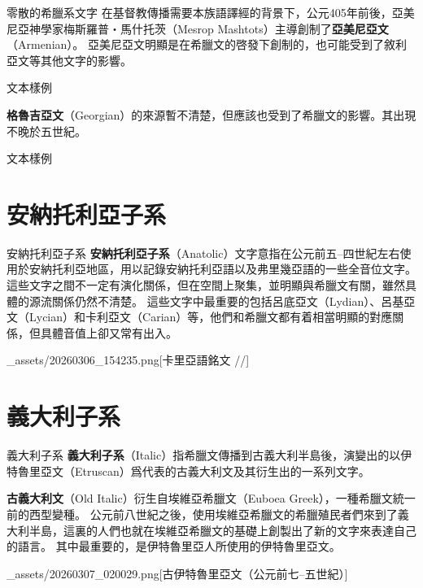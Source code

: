 \documentclass[aspectratio=169]{beamer}
\newcommand{\NotoLatinSans}[1]{{\textsf{\NOT{#1}}}}
\newcommand{\GK}[1]{{\NotoLatinSans{#1}}}
\begin{document}
\begin{frame}{零散的希臘系文字}
    在基督教傳播需要本族語譯經的背景下，公元405年前後，亞美尼亞神學家梅斯羅普・馬什托茨（Mesrop Mashtots）主導創制了\textbf{亞美尼亞文}（Armenian）。
    亞美尼亞文明顯是在希臘文的啓發下創制的，也可能受到了敘利亞文等其他文字的影響。

    \begin{block}{文本樣例}
    \end{block}

    \textbf{格魯吉亞文}（Georgian）的來源暫不清楚，但應該也受到了希臘文的影響。其出現不晚於五世紀。

    \begin{block}{文本樣例}
    \end{block}
\end{frame}

\section{安納托利亞子系}
\begin{frame}{安納托利亞子系}
    \textbf{安納托利亞子系}（Anatolic）文字意指在公元前五--四世紀左右使用於安納托利亞地區，用以記錄安納托利亞語以及弗里幾亞語的一些全音位文字。
    這些文字之間不一定有演化關係，但在空間上聚集，並明顯與希臘文有關，雖然具體的源流關係仍然不清楚。
    這些文字中最重要的包括呂底亞文（Lydian）、呂基亞文（Lycian）和卡利亞文（Carian）等，他們和希臘文都有着相當明顯的對應關係，但具體音值上卻又常有出入。

    \begin{OneImage}[htbp][\linewidth][0.4\textheight]{_assets/20260306_154235.png}[卡里亞語銘文 /\GK{qlaʎiç}/]\end{OneImage}
\end{frame}

\section{義大利子系}
\begin{frame}{義大利子系}
    \textbf{義大利子系}（Italic）指希臘文傳播到古義大利半島後，演變出的以伊特魯里亞文（Etruscan）爲代表的古義大利文及其衍生出的一系列文字。

    \textbf{古義大利文}（Old Italic）衍生自埃維亞希臘文（Euboea Greek），一種希臘文統一前的西型變種。
    公元前八世紀之後，使用埃維亞希臘文的希臘殖民者們來到了義大利半島，這裏的人們也就在埃維亞希臘文的基礎上創製出了新的文字來表達自己的語言。
    其中最重要的，是伊特魯里亞人所使用的伊特魯里亞文。
    
    \begin{OneImage}[htbp][\linewidth][0.4\textheight]{_assets/20260307_020029.png}[古伊特魯里亞文（公元前七--五世紀）]\end{OneImage}
\end{frame}
\end{document}
